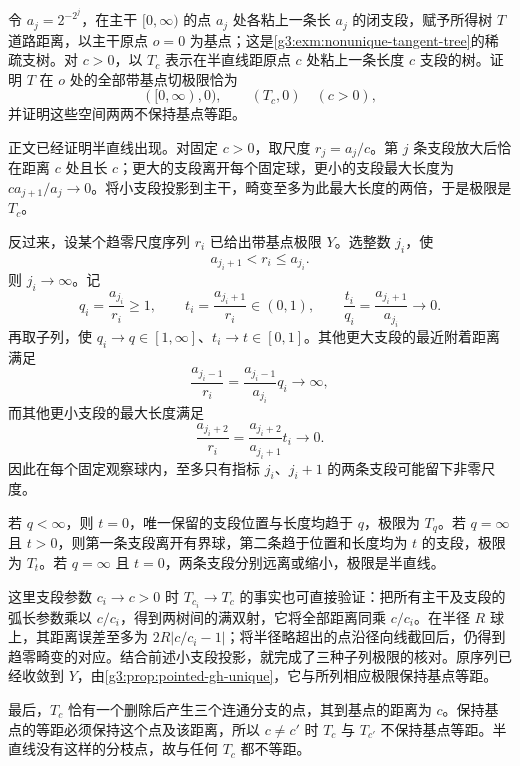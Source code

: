 \begin{exercise}\label{g3:ex:all-tangents-of-sparse-tree}
	令 \(a_j=2^{-2^j}\)，在主干 \([0,\infty)\) 的点 \(a_j\) 处各粘上一条长 \(a_j\) 的闭支段，赋予所得树 \(T\) 道路距离，以主干原点 \(o=0\) 为基点；这是\cref{g3:exm:nonunique-tangent-tree}的稀疏支树。对 \(c>0\)，以 \(T_c\) 表示在半直线距原点 \(c\) 处粘上一条长度 \(c\) 支段的树。证明 \(T\) 在 \(o\) 处的全部带基点切极限恰为
	\[
		([0,\infty),0),\qquad (T_c,0)\quad(c>0),
	\]
	并证明这些空间两两不保持基点等距。
\end{exercise}
\begin{solution}
	正文已经证明半直线出现。对固定 \(c>0\)，取尺度 \(r_j=a_j/c\)。第 \(j\) 条支段放大后恰在距离 \(c\) 处且长 \(c\)；更大的支段离开每个固定球，更小的支段最大长度为 \(ca_{j+1}/a_j\to0\)。将小支段投影到主干，畸变至多为此最大长度的两倍，于是极限是 \(T_c\)。

	反过来，设某个趋零尺度序列 \(r_i\) 已给出带基点极限 \(Y\)。选整数 \(j_i\)，使
	\[
		a_{j_i+1}<r_i\le a_{j_i}.
	\]
	则 \(j_i\to\infty\)。记
	\[
		q_i=\frac{a_{j_i}}{r_i}\ge1,\qquad
		t_i=\frac{a_{j_i+1}}{r_i}\in(0,1),\qquad
		\frac{t_i}{q_i}=\frac{a_{j_i+1}}{a_{j_i}}\longrightarrow0.
	\]
	再取子列，使 \(q_i\to q\in[1,\infty]\)、\(t_i\to t\in[0,1]\)。其他更大支段的最近附着距离满足
	\[
		\frac{a_{j_i-1}}{r_i}
		=\frac{a_{j_i-1}}{a_{j_i}}q_i\longrightarrow\infty,
	\]
	而其他更小支段的最大长度满足
	\[
		\frac{a_{j_i+2}}{r_i}
		=\frac{a_{j_i+2}}{a_{j_i+1}}t_i\longrightarrow0.
	\]
	因此在每个固定观察球内，至多只有指标 \(j_i\)、\(j_i+1\) 的两条支段可能留下非零尺度。

	若 \(q<\infty\)，则 \(t=0\)，唯一保留的支段位置与长度均趋于 \(q\)，极限为 \(T_q\)。若 \(q=\infty\) 且 \(t>0\)，则第一条支段离开有界球，第二条趋于位置和长度均为 \(t\) 的支段，极限为 \(T_t\)。若 \(q=\infty\) 且 \(t=0\)，两条支段分别远离或缩小，极限是半直线。

	这里支段参数 \(c_i\to c>0\) 时 \(T_{c_i}\to T_c\) 的事实也可直接验证：把所有主干及支段的弧长参数乘以 \(c/c_i\)，得到两树间的满双射，它将全部距离同乘 \(c/c_i\)。在半径 \(R\) 球上，其距离误差至多为 \(2R|c/c_i-1|\)；将半径略超出的点沿径向线截回后，仍得到趋零畸变的对应。结合前述小支段投影，就完成了三种子列极限的核对。原序列已经收敛到 \(Y\)，由\cref{g3:prop:pointed-gh-unique}，它与所列相应极限保持基点等距。

	最后，\(T_c\) 恰有一个删除后产生三个连通分支的点，其到基点的距离为 \(c\)。保持基点的等距必须保持这个点及该距离，所以 \(c\ne c'\) 时 \(T_c\) 与 \(T_{c'}\) 不保持基点等距。半直线没有这样的分枝点，故与任何 \(T_c\) 都不等距。
\end{solution}

